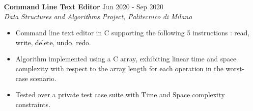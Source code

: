 \noindent
\textbf{Command Line Text Editor} \hfill Jun 2020 - Sep 2020 \\
\textit{Data Structures and Algorithms Project, Politecnico di Milano}
\begin{itemize}[noitemsep,topsep=0pt]
    \item  Command line text editor in C supporting the following 5 instructions : read, write, delete, undo, redo.
    \item  Algorithm implemented using a C array, exhibiting linear time and space complexity with respect to the array length for each operation in the worst-case scenario.
    \item  Tested over a private test case suite with Time and Space complexity constraints.
\end{itemize}